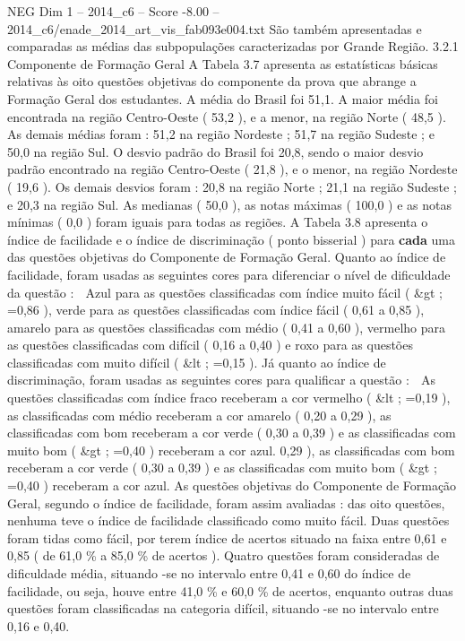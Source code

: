 \begin{textsample}{NEG Dim 1 – 2014\_c6 – Score -8.00 – 2014\_c6/enade\_2014\_art\_vis\_fab093e004.txt}
São também apresentadas e comparadas as médias das subpopulações caracterizadas por Grande Região. 3.2.1 Componente de Formação Geral A Tabela 3.7 apresenta as estatísticas básicas relativas às oito questões objetivas do componente da prova que abrange a Formação Geral dos estudantes.
A média do Brasil foi 51,1.
A maior média foi encontrada na região Centro-Oeste ( 53,2 ), e a menor, na região Norte ( 48,5 ).
As demais médias foram : 51,2 na região Nordeste ; 51,7 na região Sudeste ; e 50,0 na região Sul.
O desvio padrão do Brasil foi 20,8, sendo o maior desvio padrão encontrado na região Centro-Oeste ( 21,8 ), e o menor, na região Nordeste ( 19,6 ).
Os demais desvios foram : 20,8 na região Norte ; 21,1 na região Sudeste ; e 20,3 na região Sul.
As medianas ( 50,0 ), as notas máximas ( 100,0 ) e as notas mínimas ( 0,0 ) foram iguais para todas as regiões.
A Tabela 3.8 apresenta o índice de facilidade e o índice de discriminação ( ponto bisserial ) para \textbf{cada} uma das questões objetivas do Componente de Formação Geral.
Quanto ao índice de facilidade, foram usadas as seguintes cores para diferenciar o nível de dificuldade da questão :  Azul para as questões classificadas com índice muito fácil ( \&gt ; =0,86 ), verde para as questões classificadas com índice fácil ( 0,61 a 0,85 ), amarelo para as questões classificadas com médio ( 0,41 a 0,60 ), vermelho para as questões classificadas com difícil ( 0,16 a 0,40 ) e roxo para as questões classificadas com muito difícil ( \&lt ; =0,15 ).
Já quanto ao índice de discriminação, foram usadas as seguintes cores para qualificar a questão :  As questões classificadas com índice fraco receberam a cor vermelho ( \&lt ; =0,19 ), as classificadas com médio receberam a cor amarelo ( 0,20 a 0,29 ), as classificadas com bom receberam a cor verde ( 0,30 a 0,39 ) e as classificadas com muito bom ( \&gt ; =0,40 ) receberam a cor azul. 0,29 ), as classificadas com bom receberam a cor verde ( 0,30 a 0,39 ) e as classificadas com muito bom ( \&gt ; =0,40 ) receberam a cor azul.
As questões objetivas do Componente de Formação Geral, segundo o índice de facilidade, foram assim avaliadas : das oito questões, nenhuma teve o índice de facilidade classificado como muito fácil.
Duas questões foram tidas como fácil, por terem índice de acertos situado na faixa entre 0,61 e 0,85 ( de 61,0 \% a 85,0 \% de acertos ).
Quatro questões foram consideradas de dificuldade média, situando -se no intervalo entre 0,41 e 0,60 do índice de facilidade, ou seja, houve entre 41,0 \% e 60,0 \% de acertos, enquanto outras duas questões foram classificadas na categoria difícil, situando -se no intervalo entre 0,16 e 0,40.

\end{textsample}
